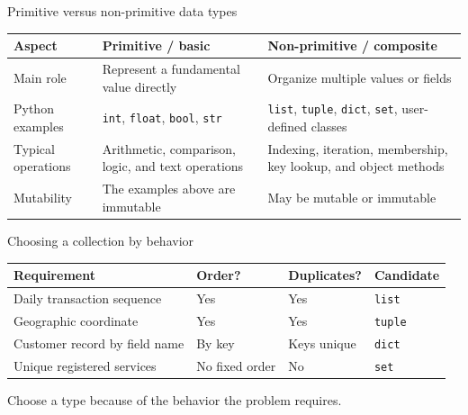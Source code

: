 \documentclass[aspectratio=169]{beamer}
\begin{document}
\begin{frame}{Primitive versus non-primitive data types}
  \small
  \begin{center}
    \setlength{\tabcolsep}{4pt}
    \begin{tabular}{L{0.18\textwidth}L{0.36\textwidth}L{0.36\textwidth}}
      \toprule
      \textbf{Aspect} & \textbf{Primitive / basic} & \textbf{Non-primitive / composite} \\
      \midrule
      Main role & Represent a fundamental value directly & Organize multiple values or fields \\
      \addlinespace
      Python examples & \texttt{int}, \texttt{float}, \texttt{bool}, \texttt{str} &
        \texttt{list}, \texttt{tuple}, \texttt{dict}, \texttt{set}, user-defined classes \\
      \addlinespace
      Typical operations & Arithmetic, comparison, logic, and text operations &
        Indexing, iteration, membership, key lookup, and object methods \\
      \addlinespace
      Mutability & The examples above are immutable & May be mutable or immutable \\
      \bottomrule
    \end{tabular}
  \end{center}


\end{frame}

\begin{frame}{Choosing a collection by behavior}
  \begin{center}
    \setlength{\tabcolsep}{5pt}
    \begin{tabular}{L{0.29\textwidth}L{0.16\textwidth}L{0.16\textwidth}L{0.20\textwidth}}
      \toprule
      \textbf{Requirement} & \textbf{Order?} & \textbf{Duplicates?} & \textbf{Candidate} \\
      \midrule
      Daily transaction sequence & Yes & Yes & \texttt{list} \\
      \addlinespace
      Geographic coordinate & Yes & Yes & \texttt{tuple} \\
      \addlinespace
      Customer record by field name & By key & Keys unique & \texttt{dict} \\
      \addlinespace
      Unique registered services & No fixed order & No & \texttt{set} \\
      \bottomrule
    \end{tabular}
  \end{center}

  \vspace{0.5em}
  \centering
  \Large Choose a type because of the behavior the problem requires.
\end{frame}
\end{document}
